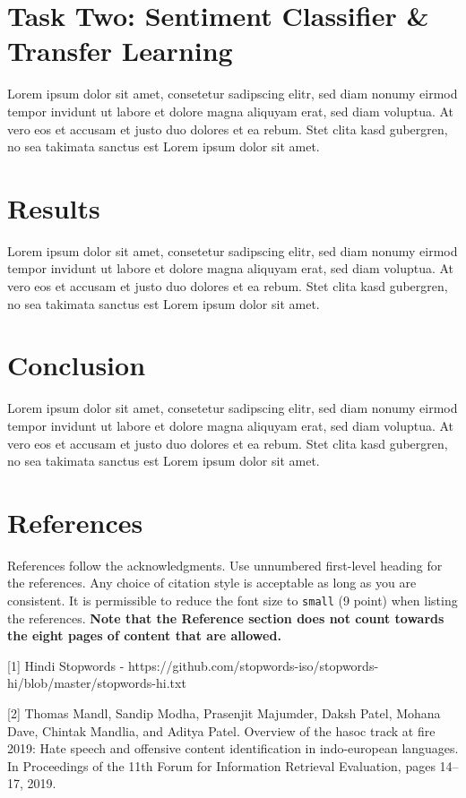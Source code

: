 \documentclass{article}
\begin{document}
\section{Task Two: Sentiment Classifier \& Transfer Learning}

Lorem ipsum dolor sit amet, consetetur sadipscing elitr, sed diam nonumy eirmod tempor invidunt ut labore et dolore magna aliquyam erat, sed diam voluptua. At vero eos et accusam et justo duo dolores et ea rebum. Stet clita kasd gubergren, no sea takimata sanctus est Lorem ipsum dolor sit amet.



\section{Results}

Lorem ipsum dolor sit amet, consetetur sadipscing elitr, sed diam nonumy eirmod tempor invidunt ut labore et dolore magna aliquyam erat, sed diam voluptua. At vero eos et accusam et justo duo dolores et ea rebum. Stet clita kasd gubergren, no sea takimata sanctus est Lorem ipsum dolor sit amet.

\section{Conclusion}

Lorem ipsum dolor sit amet, consetetur sadipscing elitr, sed diam nonumy eirmod tempor invidunt ut labore et dolore magna aliquyam erat, sed diam voluptua. At vero eos et accusam et justo duo dolores et ea rebum. Stet clita kasd gubergren, no sea takimata sanctus est Lorem ipsum dolor sit amet.

\section*{References}

References follow the acknowledgments. Use unnumbered first-level heading for
the references. Any choice of citation style is acceptable as long as you are
consistent. It is permissible to reduce the font size to \verb+small+ (9 point)
when listing the references.
{\bf Note that the Reference section does not count towards the eight pages of content that are allowed.}
\medskip

\small

[1] Hindi Stopwords - https://github.com/stopwords-iso/stopwords-hi/blob/master/stopwords-hi.txt

[2] Thomas Mandl, Sandip Modha, Prasenjit Majumder, Daksh Patel, Mohana Dave, Chintak Mandlia, and Aditya Patel. Overview of the hasoc track at fire 2019: Hate speech and offensive content identification in indo-european languages. In Proceedings of the 11th Forum for Information Retrieval Evaluation, pages 14–17, 2019.
\end{document}
